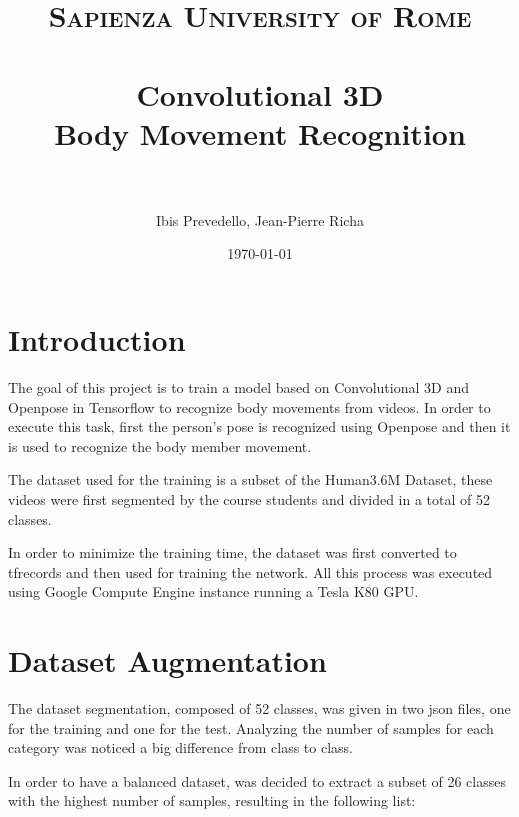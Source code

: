 \documentclass{article}
\title{
\normalfont \normalsize
\textsc{Sapienza University of Rome} \\ [25pt] %
\horrule{0.5pt} \\[0.4cm] %
\LARGE Convolutional 3D \\ %
\large Body Movement Recognition \\
\horrule{2pt} \\[0.5cm] %
}
\author{Ibis Prevedello, Jean-Pierre Richa} %
\date{\normalsize\today} %
\begin{document}
\sloppy %

\maketitle %



\section{Introduction}

The goal of this project is to train a model based on Convolutional 3D and Openpose in Tensorflow to recognize body movements from videos. In order to execute this task, first the person's pose is recognized using Openpose and then it is used to recognize the body member movement.

The dataset used for the training is a subset of the Human3.6M Dataset, these videos were first segmented by the course students and divided in a total of 52 classes.

In order to minimize the training time, the dataset was first converted to tfrecords and then used for training the network. All this process was executed using Google Compute Engine instance running a Tesla K80 GPU.


\section{Dataset Augmentation}

The dataset segmentation, composed of 52 classes, was given in two json files, one for the training and one for the test. Analyzing the number of samples for each category was noticed a big difference from class to class.

In order to have a balanced dataset, was decided to extract a subset of 26 classes with the highest number of samples, resulting in the following list:
\end{document}
